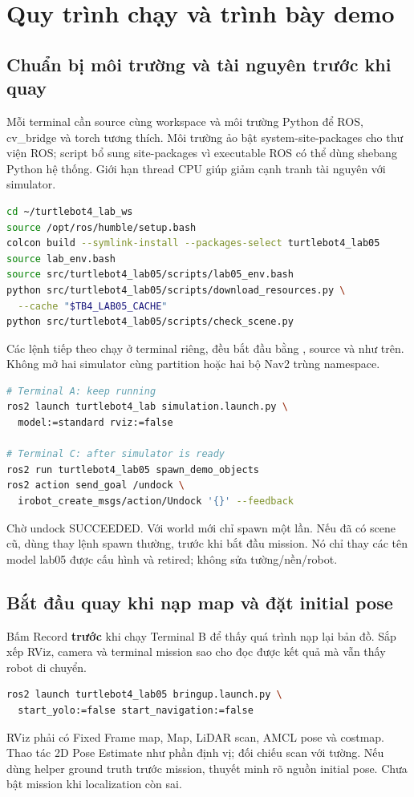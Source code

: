 \clearpage
\section{Quy trình chạy và trình bày demo}
\subsection{Chuẩn bị môi trường và tài nguyên trước khi quay}
Mỗi terminal cần source cùng workspace và môi trường Python để ROS, cv\_bridge và torch tương thích. Môi trường ảo bật system-site-packages cho thư viện ROS; script bổ sung site-packages vì executable ROS có thể dùng shebang Python hệ thống. Giới hạn thread CPU giúp giảm cạnh tranh tài nguyên với simulator.
\begin{lstlisting}[language=bash,caption={Chuẩn bị workspace và tài nguyên trước lượt demo},label={lst:prepare}]
cd ~/turtlebot4_lab_ws
source /opt/ros/humble/setup.bash
colcon build --symlink-install --packages-select turtlebot4_lab05
source lab_env.bash
source src/turtlebot4_lab05/scripts/lab05_env.bash
python src/turtlebot4_lab05/scripts/download_resources.py \
  --cache "$TB4_LAB05_CACHE"
python src/turtlebot4_lab05/scripts/check_scene.py
\end{lstlisting}
Các lệnh tiếp theo chạy ở terminal riêng, đều bắt đầu bằng , source  và  như trên. Không mở hai simulator cùng partition hoặc hai bộ Nav2 trùng namespace.
\begin{lstlisting}[language=bash,caption={Terminal A và C: simulator, vật thể và undock},label={lst:sim}]
# Terminal A: keep running
ros2 launch turtlebot4_lab simulation.launch.py \
  model:=standard rviz:=false

# Terminal C: after simulator is ready
ros2 run turtlebot4_lab05 spawn_demo_objects
ros2 action send_goal /undock \
  irobot_create_msgs/action/Undock '{}' --feedback
\end{lstlisting}
Chờ undock SUCCEEDED. Với world mới chỉ spawn một lần. Nếu đã có scene cũ, dùng  thay lệnh spawn thường, trước khi bắt đầu mission. Nó chỉ thay các tên model lab05 được cấu hình và retired; không sửa tường/nền/robot.

\subsection{Bắt đầu quay khi nạp map và đặt initial pose}
Bấm Record \textbf{trước} khi chạy Terminal B để thấy quá trình nạp lại bản đồ. Sắp xếp RViz, camera và terminal mission sao cho đọc được kết quả mà vẫn thấy robot di chuyển.
\begin{lstlisting}[language=bash,caption={Terminal B: nạp map cũ, AMCL và Nav2},label={lst:bringup}]
ros2 launch turtlebot4_lab05 bringup.launch.py \
  start_yolo:=false start_navigation:=false
\end{lstlisting}
RViz phải có Fixed Frame map, Map, LiDAR scan, AMCL pose và costmap. Thao tác 2D Pose Estimate như phần định vị; đối chiếu scan với tường. Nếu dùng helper ground truth trước mission, thuyết minh rõ nguồn initial pose. Chưa bật mission khi localization còn sai.
\clearpage


